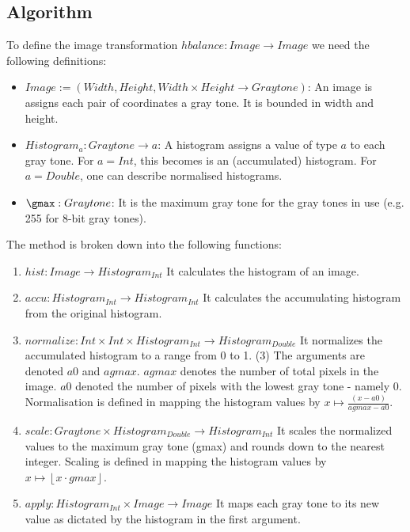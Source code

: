   \subsection{Algorithm}
    To define the image transformation $ hbalance: Image \rightarrow Image$ we need the following definitions:
    \begin{itemize}
      \item $Image := (Width,Height,Width \times Height \rightarrow Graytone)$:
        An image is assigns each pair of coordinates a gray tone. It is bounded in width and height.
      \item $Histogram_a: Graytone \rightarrow a$:
        A histogram assigns a value of type $a$ to each gray tone. For $a = Int$,
        this becomes is an (accumulated) histogram. For $a = Double$, one can
        describe normalised histograms.
      \item $\gmax: Graytone$:
        It is the maximum gray tone for the gray tones in use (e.g. 255 for 8-bit gray tones).
    \end{itemize}
    
    The method is broken down into the following functions:
    
    \begin{enumerate}
      \item $hist: Image \rightarrow Histogram_{Int}$
        It calculates the histogram of an image.
      \item $accu: Histogram_{Int} \rightarrow Histogram_{Int}$
        It calculates the accumulating histogram from the original histogram.
      \item $normalize: Int \times Int \times Histogram_{Int} \rightarrow Histogram_{Double}$
        It normalizes the accumulated histogram
        to a range from 0 to 1. (3)
        The arguments are denoted $a0$ and $agmax$.
        $agmax$ denotes the number of total pixels in the image.
        $a0$ denoted the number of pixels with the lowest gray tone - namely 0.
        Normalisation is defined in mapping the histogram values by $x \mapsto \frac{(x - a0)}{agmax - a0}$.
      \item $scale: Graytone \times Histogram_{Double} \rightarrow Histogram_{Int}$
        It scales the normalized values to the maximum gray tone (gmax) and rounds down to the nearest integer.
        Scaling is defined in mapping the histogram values by $x \mapsto \left \lfloor{x \cdot gmax}\right \rfloor $.
      \item $apply: Histogram_{Int} \times Image \rightarrow Image$
        It maps each gray tone to its new value as dictated by the histogram in the first argument.
    \end{enumerate}
    
